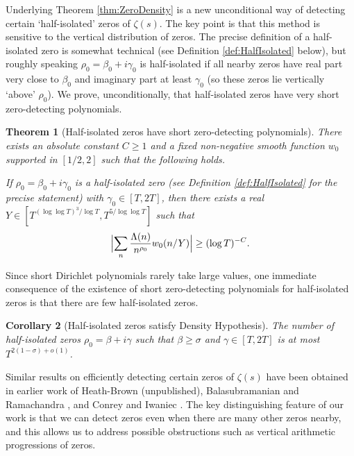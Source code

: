\documentclass[12pt]{amsart}
\theoremstyle{plain}
\newtheorem{theorem}{Theorem}
\newtheorem{corollary}[theorem]{Corollary}
\theoremstyle{definition}
\theoremstyle{remark}
\begin{document}
Underlying Theorem \ref{thm:ZeroDensity} is a new unconditional way of detecting certain `half-isolated' zeros of $\zeta(s)$. The key point is that this method is sensitive to the vertical distribution of zeros.  The precise definition of a half-isolated zero is somewhat technical (see Definition \ref{def:HalfIsolated} below), but roughly speaking $\rho_0=\beta_0+i\gamma_0$ is half-isolated if all nearby zeros have real part very close to $\beta_0$ and imaginary part at least $\gamma_0$ (so these zeros lie vertically `above' $\rho_0$). We prove, unconditionally, that half-isolated zeros have very short zero-detecting polynomials.
%
%
%
%
\begin{theorem}[Half-isolated zeros have short zero-detecting polynomials]\label{thm:HalfIsolated}
There exists an absolute constant $C\geq 1$ and a fixed non-negative smooth function $w_0$ supported in $[1/2,2]$ such that the following holds.

If $\rho_0=\beta_0+i\gamma_0$ is a half-isolated zero (see Definition \ref{def:HalfIsolated} for the precise statement) with $\gamma_0 \in [T,2T]$, then there exists a real $Y \in [T^{(\log\log{T})^3/\log{T}},T^{5/\log\log{T}}]$ such that
\begin{align*}
\Bigl|\sum_{n} \frac{\Lambda(n)}{n^{\rho_0}} w_0(n/Y) \Bigr| \geq (\log T)^{-C}.
\end{align*}
\end{theorem}
%
%
%
%
Since short Dirichlet polynomials rarely take large values, one immediate consequence of the existence of short zero-detecting polynomials for half-isolated zeros is that there are few half-isolated zeros.
%
%
%
%
\begin{corollary}[Half-isolated zeros satisfy Density Hypothesis]\label{cor:half isolated zeroes satisfy DH}
The number of half-isolated zeros $\rho_0 = \beta+i\gamma$ such that $\beta \geq \sigma$ and $\gamma \in [T,2T]$ is at most $T^{2(1-\sigma)+o(1)}$.
\end{corollary}
%
%
%
%
Similar results on efficiently detecting certain zeros of $\zeta(s)$ have been obtained in earlier work of Heath-Brown (unpublished), Balasubramanian and Ramachandra \cite{BS1982}, and Conrey and Iwaniec \cite{CI2014}. The key distinguishing feature of our work is that we can detect zeros even when there are many other zeros nearby, and this allows us to address possible obstructions such as vertical arithmetic progressions of zeros.
\end{document}
